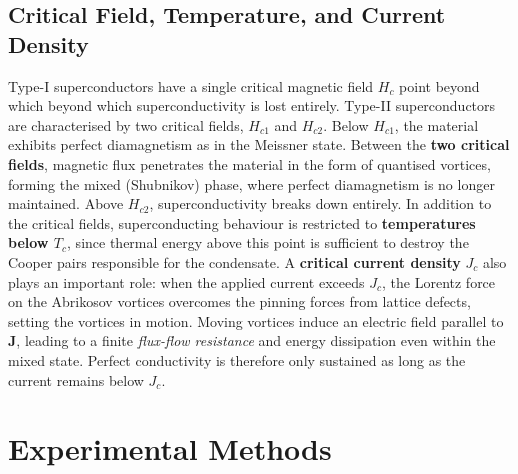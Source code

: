 \documentclass[a4paper,11pt]{article}
\numberwithin{equation}{section}
\begin{document}
\subsection{Critical Field, Temperature, and Current Density}

Type-I superconductors have a single critical magnetic field $H_{c}$ point beyond which beyond which superconductivity is lost entirely. Type-II superconductors are characterised by two critical fields, $H_{c1}$ and $H_{c2}$. Below $H_{c1}$, the material exhibits perfect diamagnetism as in the Meissner state. 
Between the \textbf{two critical fields}, magnetic flux penetrates the material in the form of 
quantised vortices, forming the mixed (Shubnikov) phase, where perfect diamagnetism is 
no longer maintained\cite{Chaddah2003}. Above $H_{c2}$, superconductivity breaks down entirely. In addition 
to the critical fields, superconducting behaviour is restricted to \textbf{temperatures below $T_c$}, 
since thermal energy above this point is sufficient to destroy the Cooper pairs responsible 
for the condensate. A \textbf{critical current density} $J_c$ also plays an important role: when the 
applied current exceeds $J_c$, the Lorentz force on the Abrikosov vortices overcomes the 
pinning forces from lattice defects, setting the vortices in motion\cite{Chaddah2003}. Moving vortices induce 
an electric field parallel to $\mathbf{J}$, leading to a finite \textit{flux-flow resistance} 
and energy dissipation even within the mixed state\cite{Chaddah2003}. Perfect conductivity is therefore only 
sustained as long as the current remains below $J_c$.

\section[Experimental Methods]{Experimental Methods\protect\footnotemark}
\end{document}
